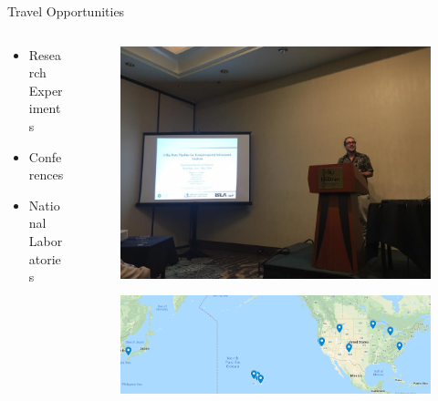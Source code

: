 \documentclass{beamer}
\begin{document}
\begin{frame}{Travel Opportunities}
\begin{columns}
	\begin{column}{.50\textwidth}
		
	\begin{itemize}
		\item Research Experiments
		\item Conferences
		\item National Laboratories
	\end{itemize}
	\end{column}

	\begin{column}{.50\textwidth}
		\begin{figure}
			\includegraphics[width=\linewidth]{img/conference.jpg}
		\end{figure}
		\begin{figure}
			\includegraphics[width=\linewidth]{img/doublebutt.png}
		\end{figure}
	\end{column}
\end{columns}
\end{frame}
\end{document}
